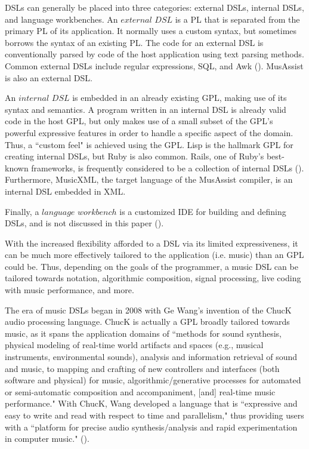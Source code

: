 \documentclass{report}
\newcommand\citeparen[1]{(\cite{#1})}
\begin{document}
DSLs can generally be placed into three categories: external DSLs, internal DSLs, and language workbenches. An $external$ $DSL$ is a PL that is separated  from the primary PL of its application. It normally uses a custom syntax, but sometimes borrows the syntax of an existing PL. The code for an external DSL is conventionally parsed by code of the host application using text parsing methods. Common external DSLs include regular expressions, SQL, and Awk  \citeparen{fowler_parsons_2011}. MusAssist is also an external DSL.

An $internal$ $DSL$ is embedded in an already existing GPL, making use  of its  syntax and semantics. A program written in an internal DSL is already valid code in the host GPL, but only makes use of a small subset of the GPL's powerful expressive features in order to handle a specific aspect of the domain. Thus, a ``custom feel" is achieved using the GPL. Lisp is the hallmark GPL for creating internal DSLs, but Ruby is also common. Rails, one of Ruby's best-known frameworks, is frequently considered to be a collection of internal DSLs   \citeparen{fowler_parsons_2011}. Furthermore, MusicXML, the target language of the MusAssist compiler, is an internal DSL embedded in XML.

Finally, a $ language$ $workbench$ is a customized IDE for building and defining DSLs, and is not discussed in this paper \citeparen{fowler_parsons_2011}. 

With the increased flexibility afforded to  a DSL via its limited expressiveness, it can be much  more effectively tailored to the application (i.e. music) than an GPL could be. Thus, depending on the goals of the programmer, a music DSL can be tailored towards notation, algorithmic composition, signal processing, live coding with music performance, and more. 

The era of music DSLs began in 2008  with Ge Wang's invention of the ChucK audio processing language. ChucK is actually a GPL broadly tailored towards music, as it spans the application domains of ``methods for sound synthesis, physical modeling of real-time world artifacts and spaces (e.g.,
musical instruments, environmental sounds), analysis and information retrieval of sound and music, to mapping and crafting of new controllers and interfaces (both software and physical) for music, algorithmic/generative processes for automated or semi-automatic composition and accompaniment, [and] real-time music performance." With ChucK, Wang developed a language that is ``expressive and easy to write and read with respect to time and parallelism," thus providing users with a ``platform for precise audio synthesis/analysis and rapid experimentation in computer music." \citeparen{wang_2008}. 
\end{document}
